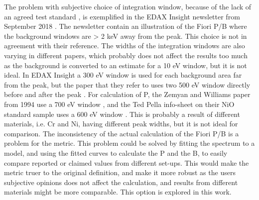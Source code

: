 The problem with subjective choice of integration window, because of the lack of an agreed test standard \cite{williams_standard_definitions_1986}, is exemplified in the EDAX Insight newsletter from September 2018 \cite{edax_insight_2018}.
The newsletter contain an illustration of the Fiori P/B where the background windows are > 2 keV away from the peak.
This choice is not in agreement with their reference.
The widths of the integration windows are also varying in different papers, which probably does not affect the results too much as the background is converted to an estimate for a 10 eV window, but it is not ideal.
In EDAX Insight a 300 eV window is used for each background area far from the peak, but the paper that they refer to uses two 500 eV window directly before and after the peak \cite{egerton_nio_characterization_1994}.
For calculation of P, the Zemyan and Williams paper from 1994 use a 700 eV window \cite{zemyan_standard_performance_1994}, and the Ted Pella info-sheet on their NiO standard sample uses a 600 eV window \cite{ted_pella_nio_tem_2019}.
This is probably a result of different materials, i.e. Cr and Ni, having different peak widths, but it is not ideal for comparison.
The inconsistency of the actual calculation of the Fiori P/B is a problem for the metric.
This problem could be solved by fitting the spectrum to a model, and using the fitted curves to calculate the P and the B, to easily compare reported or claimed values from different set-ups.
This would make the metric truer to the original definition, and make it more robust as the users subjective opinions does not affect the calculation, and results from different materials might be more comparable.
This option is explored in this work.





